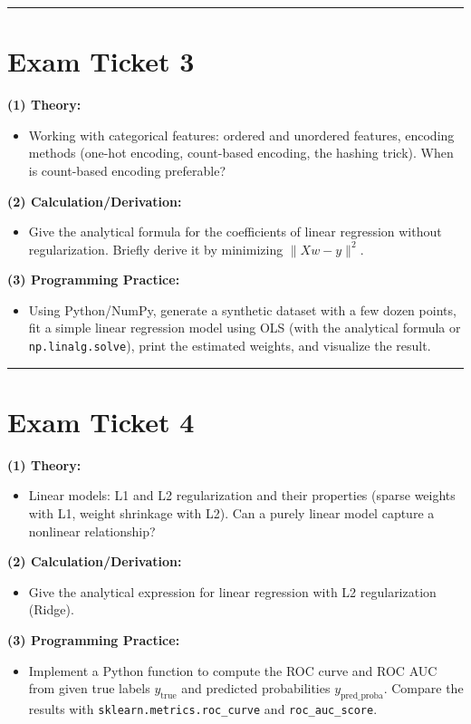 \documentclass[a4paper,12pt]{article}
\begin{document}
\noindent\rule{\textwidth}{0.4pt}
\newpage

\section*{Exam Ticket 3}
\textbf{(1) Theory:}
\begin{itemize}
  \item Working with categorical features: ordered and unordered features, encoding methods (one-hot encoding, count-based encoding, the hashing trick). When is count-based encoding preferable?
\end{itemize}

\textbf{(2) Calculation/Derivation:}
\begin{itemize}
  \item Give the analytical formula for the coefficients of linear regression without regularization. Briefly derive it by minimizing $\|Xw - y\|^2$.
\end{itemize}

\textbf{(3) Programming Practice:}
\begin{itemize}
  \item Using Python/NumPy, generate a synthetic dataset with a few dozen points, fit a simple linear regression model using OLS (with the analytical formula or \texttt{np.linalg.solve}), print the estimated weights, and visualize the result.
\end{itemize}

\noindent\rule{\textwidth}{0.4pt}
\newpage

\section*{Exam Ticket 4}
\textbf{(1) Theory:}
\begin{itemize}
  \item Linear models: L1 and L2 regularization and their properties (sparse weights with L1, weight shrinkage with L2). Can a purely linear model capture a nonlinear relationship?
\end{itemize}

\textbf{(2) Calculation/Derivation:}
\begin{itemize}
  \item Give the analytical expression for linear regression with L2 regularization (Ridge).
\end{itemize}

\textbf{(3) Programming Practice:}
\begin{itemize}
  \item Implement a Python function to compute the ROC curve and ROC AUC from given true labels $y_{\text{true}}$ and predicted probabilities $y_{\text{pred\_proba}}$. Compare the results with \texttt{sklearn.metrics.roc\_curve} and \texttt{roc\_auc\_score}.
\end{itemize}
\end{document}
